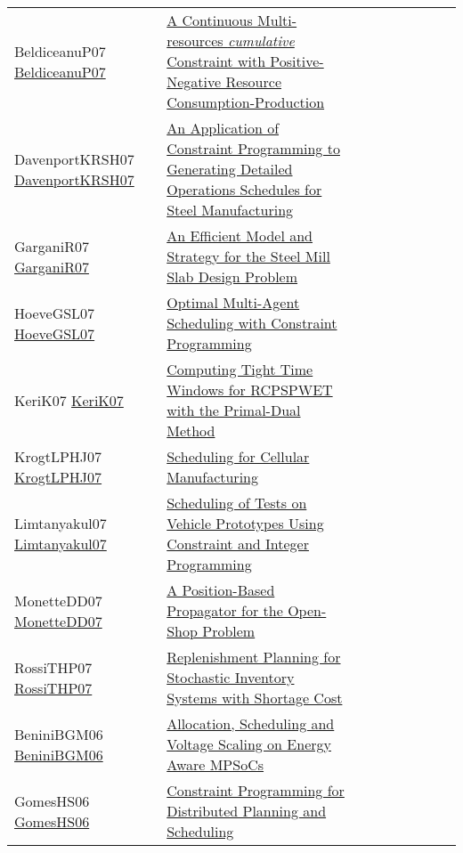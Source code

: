 {\begin{longtable}{p{3cm}p{7cm}lllllll}
BeldiceanuP07 \href{https://doi.org/10.1007/978-3-540-72397-4\_16}{BeldiceanuP07} &  \href{papers/BeldiceanuP07.pdf}{A Continuous Multi-resources \emph{cumulative} Constraint with Positive-Negative Resource Consumption-Production} &  &  &  &  &  &  & \\
DavenportKRSH07 \href{https://doi.org/10.1007/978-3-540-74970-7\_7}{DavenportKRSH07} &  \href{papers/DavenportKRSH07.pdf}{An Application of Constraint Programming to Generating Detailed Operations Schedules for Steel Manufacturing} &  &  &  &  &  &  & \\
GarganiR07 \href{https://doi.org/10.1007/978-3-540-74970-7\_8}{GarganiR07} &  \href{papers/GarganiR07.pdf}{An Efficient Model and Strategy for the Steel Mill Slab Design Problem} &  &  &  &  &  &  & \\
HoeveGSL07 \href{http://www.aaai.org/Library/AAAI/2007/aaai07-291.php}{HoeveGSL07} &  \href{papers/HoeveGSL07.pdf}{Optimal Multi-Agent Scheduling with Constraint Programming} &  &  &  &  &  &  & \\
KeriK07 \href{https://doi.org/10.1007/978-3-540-72397-4\_10}{KeriK07} &  \href{papers/KeriK07.pdf}{Computing Tight Time Windows for {RCPSPWET} with the Primal-Dual Method} &  &  &  &  &  &  & \\
KrogtLPHJ07 \href{https://doi.org/10.1007/978-3-540-74970-7\_10}{KrogtLPHJ07} &  \href{papers/KrogtLPHJ07.pdf}{Scheduling for Cellular Manufacturing} &  &  &  &  &  &  & \\
Limtanyakul07 \href{https://doi.org/10.1007/978-3-540-77903-2\_65}{Limtanyakul07} &  \href{papers/Limtanyakul07.pdf}{Scheduling of Tests on Vehicle Prototypes Using Constraint and Integer Programming} &  &  &  &  &  &  & \\
MonetteDD07 \href{https://doi.org/10.1007/978-3-540-72397-4\_14}{MonetteDD07} &  \href{papers/MonetteDD07.pdf}{A Position-Based Propagator for the Open-Shop Problem} &  &  &  &  &  &  & \\
RossiTHP07 \href{https://doi.org/10.1007/978-3-540-72397-4\_17}{RossiTHP07} &  \href{papers/RossiTHP07.pdf}{Replenishment Planning for Stochastic Inventory Systems with Shortage Cost} &  &  &  &  &  &  & \\
BeniniBGM06 \href{https://doi.org/10.1007/11757375\_6}{BeniniBGM06} &  \href{papers/BeniniBGM06.pdf}{Allocation, Scheduling and Voltage Scaling on Energy Aware MPSoCs} &  &  &  &  &  &  & \\
GomesHS06 \href{http://www.aaai.org/Library/Symposia/Spring/2006/ss06-04-024.php}{GomesHS06} &  \href{papers/GomesHS06.pdf}{Constraint Programming for Distributed Planning and Scheduling} &  &  &  &  &  &  & \\

\end{longtable}}
